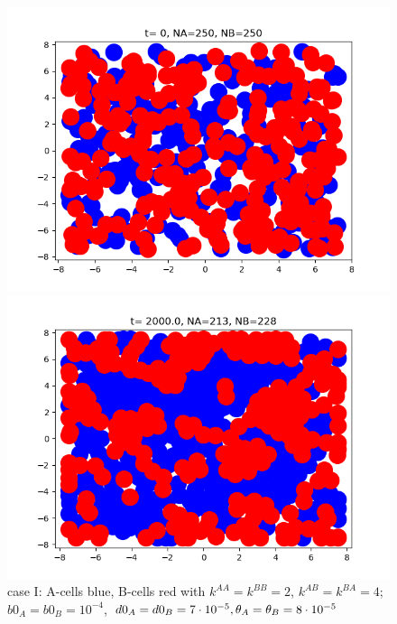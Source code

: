 \begin{figure}[htb]
	\begin{minipage}[t]{.45\textwidth}
		\centering
		\includegraphics[width=\textwidth]{micro_caseI_ini4}
	\end{minipage}
	\hfill
	\begin{minipage}[t]{.45\textwidth}
		\centering
		\includegraphics[width=\textwidth]{micro_caseI_fin4}
	\end{minipage}  
	\label{fig:1-2}
	\caption{{case I: A-cells blue, B-cells red with $k^{AA}=k^{BB}=2 $, $k^{AB}=k^{BA}=4$; $b0_A=b0_B=10^{-4}$, $d0_A=d0_B=7\cdot10^{-5}, {\theta}_A={\theta}_B=8\cdot 10^{-5}$}	}
\end{figure}


